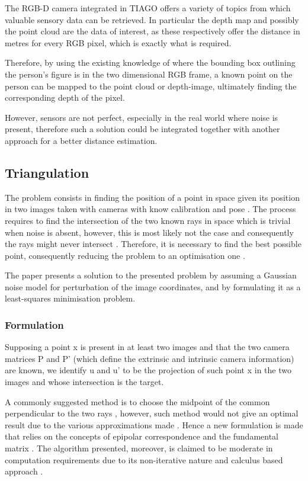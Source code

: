 The RGB-D camera integrated in TIAGO offers a variety of topics from which valuable sensory data can be retrieved. In particular the depth map and possibly the point cloud are the data of interest, as these respectively offer the distance in metres for every RGB pixel, which is exactly what is required.

Therefore, by using the existing knowledge of where the bounding box outlining the person's figure is in the two dimensional RGB frame, a known point on the person  can be mapped to the point cloud or depth-image, ultimately finding the corresponding depth of the pixel.

However, sensors are not perfect, especially in the real world where noise is present, therefore such a solution could be integrated together with another approach for a better distance estimation.

\subsection{Triangulation}

The problem consists in finding the position of a point in space given its position in two images taken with cameras with know calibration and pose \cite{hartley1997triangulation}. The process requires to find the intersection of the two known rays in space which is trivial when noise is absent, however, this is most likely not the case and consequently the rays might never intersect \cite{hartley1997triangulation}. Therefore, it is necessary to find the best possible point, consequently reducing the problem to an optimisation one \cite{hartley1997triangulation}.

The paper presents a solution to the presented problem by assuming a Gaussian noise model for perturbation of the image coordinates, and by formulating it as a least-squares minimisation problem.

\subsubsection{Formulation}

Supposing a point x is present in at least two images and that the two camera matrices P and P' (which define the extrinsic and intrinsic camera information) are known, we identify u and u' to be the projection of such point x in the two images \cite{hartley1997triangulation} and whose intersection is the target.

A commonly suggested method is to choose the midpoint of the common perpendicular to the two rays \cite{hartley1997triangulation}, however, such method would not give an optimal result due to the various approximations made \cite{hartley1997triangulation}. Hence a new formulation is made that relies on the concepts of epipolar correspondence and the fundamental matrix \cite{hartley1997triangulation}. The algorithm presented, moreover, is claimed to be moderate in computation requirements due to its non-iterative nature and calculus based approach \cite{hartley1997triangulation}.

